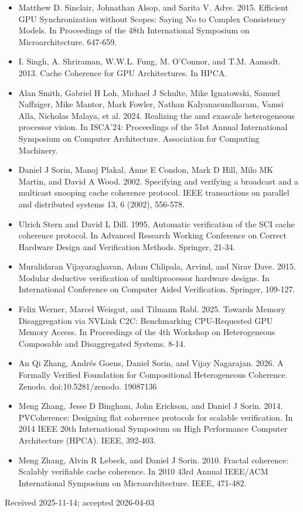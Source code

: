 \documentclass[10pt]{article}
\begin{document}
\begin{itemize}
  \item[] [42] Matthew D. Sinclair, Johnathan Alsop, and Sarita V. Adve. 2015. Efficient GPU Synchronization without Scopes: Saying No to Complex Consistency Models. In Proceedings of the 48th International Symposium on Microarchitecture. 647-659.
  \item[] [43] I. Singh, A. Shriraman, W.W.L. Fung, M. O'Connor, and T.M. Aamodt. 2013. Cache Coherence for GPU Architectures. In HPCA.
  \item[] [44] Alan Smith, Gabriel H Loh, Michael J Schulte, Mike Ignatowski, Samuel Naffziger, Mike Mantor, Mark Fowler, Nathan Kalyanasundharam, Vamsi Alla, Nicholas Malaya, et al. 2024. Realizing the amd exascale heterogeneous processor vision. In ISCA'24: Proceedings of the 51st Annual International Symposium on Computer Architecture. Association for Computing Machinery.
\end{itemize}

\begin{itemize}
  \item[] [45] Daniel J Sorin, Manoj Plakal, Anne E Condon, Mark D Hill, Milo MK Martin, and David A Wood. 2002. Specifying and verifying a broadcast and a multicast snooping cache coherence protocol. IEEE transactions on parallel and distributed systems 13, 6 (2002), 556-578.
  \item[] [46] Ulrich Stern and David L Dill. 1995. Automatic verification of the SCI cache coherence protocol. In Advanced Research Working Conference on Correct Hardware Design and Verification Methods. Springer, 21-34.
  \item[] [47] Muralidaran Vijayaraghavan, Adam Chlipala, Arvind, and Nirav Dave. 2015. Modular deductive verification of multiprocessor hardware designs. In International Conference on Computer Aided Verification. Springer, 109-127.
  \item[] [48] Felix Werner, Marcel Weisgut, and Tilmann Rabl. 2025. Towards Memory Disaggregation via NVLink C2C: Benchmarking CPU-Requested GPU Memory Access. In Proceedings of the 4th Workshop on Heterogeneous Composable and Disaggregated Systems. 8-14.
  \item[] [49] An Qi Zhang, Andrés Goens, Daniel Sorin, and Vijay Nagarajan. 2026. A Formally Verified Foundation for Compositional Heterogeneous Coherence. Zenodo. doi:10.5281/zenodo. 19087136
  \item[] [50] Meng Zhang, Jesse D Bingham, John Erickson, and Daniel J Sorin. 2014. PVCoherence: Designing flat coherence protocols for scalable verification. In 2014 IEEE 20th International Symposium on High Performance Computer Architecture (HPCA). IEEE, 392-403.
  \item[] [51] Meng Zhang, Alvin R Lebeck, and Daniel J Sorin. 2010. Fractal coherence: Scalably verifiable cache coherence. In 2010 43rd Annual IEEE/ACM International Symposium on Microarchitecture. IEEE, 471-482.
\end{itemize}

Received 2025-11-14; accepted 2026-04-03
\end{document}
